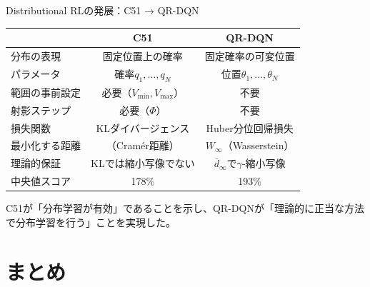 \documentclass[aspectratio=169, dvipdfmx, 11pt]{beamer}
\newcommand{\green}[1]{\textcolor{green!40!black}{#1}}
\begin{document}
\begin{frame}{Distributional RLの発展：C51 → QR-DQN}
  \begin{center}
    \begin{tabular}{l|c|c}
      \hline
       & \textbf{C51} & \textbf{QR-DQN} \\
      \hline
      分布の表現 & 固定位置上の確率 & \alert{固定確率の可変位置} \\
      パラメータ & 確率$q_1, \dots, q_N$ & 位置$\theta_1, \dots, \theta_N$ \\
      範囲の事前設定 & 必要（$V_{\min}, V_{\max}$） & \green{不要} \\
      射影ステップ & 必要（$\Phi$） & \green{不要} \\
      損失関数 & KLダイバージェンス & \alert{Huber分位回帰損失} \\
      最小化する距離 & （Cramér距離） & \green{$W_\infty$（Wasserstein）} \\
      理論的保証 & KLでは縮小写像でない & \green{$\bar{d}_\infty$で$\gamma$-縮小写像} \\
      中央値スコア & 178\% & \alert{193\%} \\
      \hline
    \end{tabular}
  \end{center}
  \vfill
  {\small C51が「分布学習が有効」であることを示し、QR-DQNが「理論的に正当な方法で分布学習を行う」ことを実現した。\\}
\end{frame}

\section{まとめ}
\end{document}
